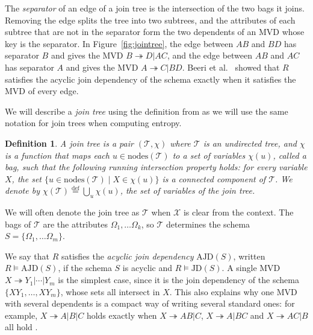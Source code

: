 \documentclass[logo,bsc,singlespacing,parskip,online]{infthesis}
\newtheorem{definition}{Definition}[section]
\begin{document}
The \emph{separator} of an edge of a join tree is the intersection of the two bags it joins. Removing the edge splits the tree into two subtrees, and the attributes of each subtree that are not in the separator form the two dependents of an MVD whose key is the separator. In Figure~\ref{fig:jointree}, the edge between $AB$ and $BD$ has separator $B$ and gives the MVD $B \twoheadrightarrow D | AC$, and the edge between $AB$ and $AC$ has separator $A$ and gives the MVD $A \twoheadrightarrow C | BD$. Beeri et al.~\cite{DBLP:journals/jacm/BeeriFMY83} showed that $R$ satisfies the acyclic join dependency of the schema exactly when it satisfies the MVD of every edge.

We will describe a \emph{join tree} using the definition from \citet{DBLP:conf/sigmod/KenigMPSS20} as we will use the same notation for join trees when computing entropy.

\begin{definition}\label{def:jointree}
A \emph{join tree} is a pair $(\mathcal{T}, \chi)$ where $\mathcal{T}$ is
an undirected tree, and $\chi$ is a function that maps each
$u \in \mathrm{nodes}(\mathcal{T})$ to a set of variables $\chi(u)$,
called a \emph{bag}, such that the following \emph{running intersection}
property holds: for every variable $X$, the set
$\{u \in \mathrm{nodes}(\mathcal{T}) \mid X \in \chi(u)\}$ is a connected
component of $\mathcal{T}$. We denote by
$\chi(\mathcal{T}) \stackrel{\mathrm{def}}{=} \bigcup_u \chi(u)$, the set
of variables of the join tree.
\end{definition}

We will often denote the join tree as $\mathcal{T}$
when $\mathcal{X}$ is clear from the context. The bags of $\mathcal{T}$ are the attributes $\Omega_1, \ldots \Omega_k$, so $\mathcal{T}$ determines the schema $S = \{\Omega_1, \ldots \Omega_m\}$.

We say that $R$ satisfies the \emph{acyclic join dependency} $\mathrm{AJD}(S)$, written $R \models \mathrm{AJD}(S)$, if the schema $S$ is acyclic and $R \models \mathrm{JD}(S)$. A single MVD $X \twoheadrightarrow Y_1 | \cdots | Y_m$ is the simplest case, since it is the join dependency of the schema $\{XY_1, \ldots, XY_m\}$, whose sets all intersect in $X$. This also explains why one MVD with several dependents is a compact way of writing several standard ones: for example,
$X \twoheadrightarrow A|B|C$ holds exactly when $X \twoheadrightarrow AB|C$, $X \twoheadrightarrow A|BC$ and
$X \twoheadrightarrow AC|B$ all hold \citep{DBLP:conf/sigmod/BeeriFH77}.
\end{document}
